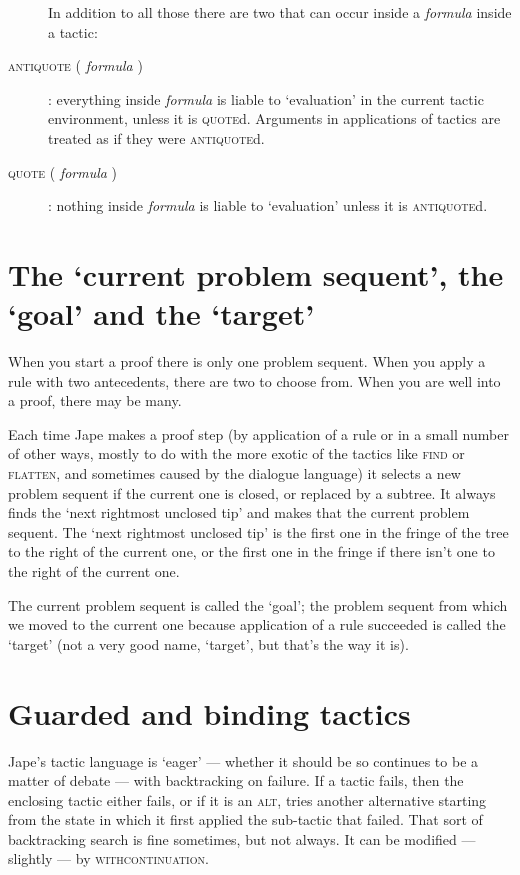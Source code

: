 \begin{description}
In addition to all those there are two that can occur inside a \textit{formula} inside a tactic:


\item [\textsc{antiquote} ( \textit{formula} )]: everything inside \textit{formula} is liable to `evaluation' in the current tactic environment, unless it is \textsc{quote}d. Arguments in applications of tactics are treated as if they were \textsc{antiquote}d.


\item [\textsc{quote} ( \textit{formula} )]: nothing inside \textit{formula} is liable to `evaluation' unless it is \textsc{antiquote}d.

\end{description}

\section{The `current problem sequent', the `goal' and the `target'}


When you start a proof there is only one problem sequent. When you apply a rule with two antecedents, there are two to choose from. When you are well into a proof, there may be many.


Each time Jape makes a proof step (by application of a rule or in a small number of other ways, mostly to do with the more exotic of the tactics like \textsc{find} or \textsc{flatten}, and sometimes caused by the dialogue language) it selects a new problem sequent if the current one is closed, or replaced by a subtree. It always finds the `next rightmost unclosed tip' and makes that the current problem sequent. The `next rightmost unclosed tip' is the first one in the fringe of the tree to the right of the current one, or the first one in the fringe if there isn't one to the right of the current one.


The current problem sequent is called the `goal'; the problem sequent from which we moved to the current one because application of a rule succeeded is called the `target' (not a very good name, `target', but that's the way it is).


\section{Guarded and binding tactics}


Jape's tactic language is `eager' --- whether it should be so continues to be a matter of debate --- with backtracking on failure. If a tactic fails, then the enclosing tactic either fails, or if it is an \textsc{alt}, tries another alternative starting from the state in which it first applied the sub-tactic that failed. That sort of backtracking search is fine sometimes, but not always. It can be modified --- slightly --- by \textsc{withcontinuation}.


